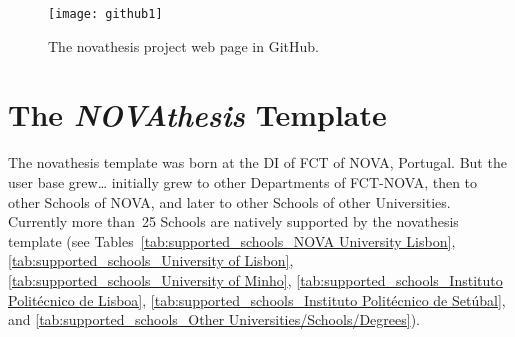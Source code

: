 \begin{figure}[htbp]
    \centering
    \texttt{[image: github1]}
    \caption{The \gls{novathesis} project web page in GitHub.}
    \label{fig:github}
\end{figure}

\section{The \emph{NOVAthesis} Template}
\label{sec:a_bit_of_history}

\ntindex[Template]{}

The \gls{novathesis} template was born at the \gls{DI} of  \gls{FCT} of \gls{NOVA}, Portugal.  But the user base grew… initially grew to other Departments of FCT-NOVA, then to other Schools of NOVA, and later to other Schools of other Universities.  Currently more than~25 Schools are natively supported by the \gls{novathesis} template (see Tables~\ref{tab:supported_schools_NOVA University Lisbon}, \ref{tab:supported_schools_University of Lisbon}, \ref{tab:supported_schools_University of Minho}, \ref{tab:supported_schools_Instituto Politécnico de Lisboa}, \ref{tab:supported_schools_Instituto Politécnico de Setúbal}, and \ref{tab:supported_schools_Other Universities/Schools/Degrees}).

\newenvironment{ntUniversity}[1]{
  \renewcommand\tabularxcolumn[1]{m{##1}}%
  \rowcolors{1}{}{GhostWhite}
    \xltabular{\linewidth}{cX}%
      \caption{#1's Schools supported by the \gls{novathesis} template\label{tab:supported_schools_#1}}\\
    \toprule%
    \rowcolor{Gainsboro}%
    & \Gape[1.5ex]{\thead[l]{#1}}\\
    \midrule%
}{%
    \bottomrule
    \endxltabular%
}

\makeatletter
\newtoggle{coverspace}
\newcommand{\docCover}[1]{%
  \setlength{\fboxsep}{0pt}%
  \togglefalse{coverspace}%
    \Gape[1.5ex]{\begin{mcellbox}[cc]
    \@for\myi:=#1\do{%
      \fbox{\colorbox{White}{\texttt{[image: 1up/\\myi]}}}%
        \ifx\@xfor@nextelement\@nnil
        \else
          \iftoggle{coverspace}{\togglefalse{coverspace}\\\\[-14pt]}{\toggletrue{coverspace}~}%
        \fi
  }%
    \end{mcellbox}}
}
\makeatother
\newcommand{\schlName}[3]{\textbf{#1} (\href{#3}{#2})}
\newcommand{\degreeName}[3]{\newline\null\quad • #1 \href{#3}{(#2)}}


